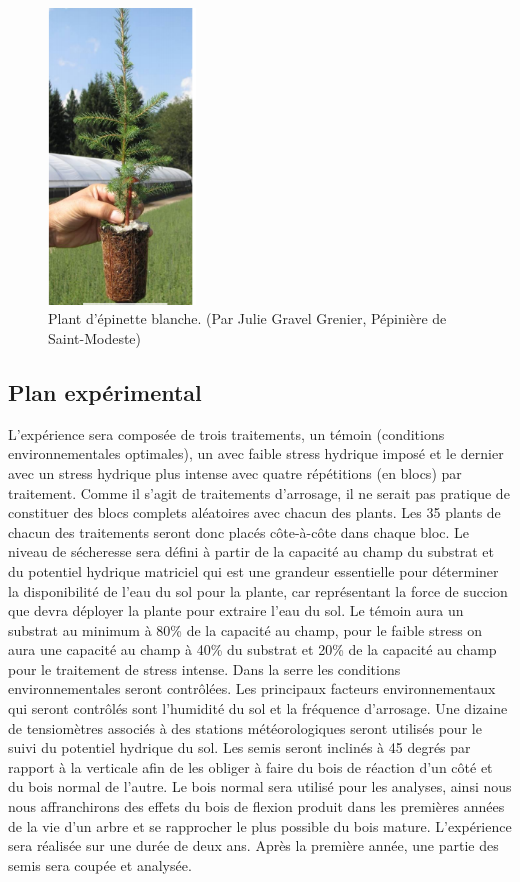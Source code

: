 \documentclass[a4paper,12pt]{report}
\begin{document}
\begin{figure}
	
	\centering
	\includegraphics[width=0.35\textwidth]{plant_epinette.png}
	\caption{Plant d'épinette blanche. (Par Julie Gravel Grenier, Pépinière de Saint-Modeste)}
	\label{plant}	
	
\end{figure}

\subsection*{Plan expérimental}

L'expérience sera composée de trois traitements, un témoin (conditions environnementales optimales), un avec faible stress hydrique imposé et le dernier avec un stress hydrique plus intense avec quatre répétitions (en blocs) par traitement. Comme il s'agit de traitements d'arrosage, il ne serait pas pratique de constituer des blocs complets aléatoires avec chacun des plants. Les 35 plants de chacun des traitements seront donc placés côte-à-côte dans chaque bloc. Le niveau de sécheresse sera défini à partir de la capacité au champ du substrat et du potentiel hydrique matriciel qui est une grandeur essentielle pour déterminer la disponibilité de l’eau du sol pour la plante, car représentant la force de succion que devra déployer la plante pour extraire l’eau du sol. Le témoin aura un substrat au minimum à 80\% de la capacité au champ, pour le faible stress on aura une capacité au champ à 40\% du substrat et 20\% de la capacité au champ pour le traitement de stress intense. Dans la serre les conditions environnementales seront contrôlées. Les principaux facteurs environnementaux qui seront contrôlés sont l'humidité du sol et la fréquence d'arrosage. Une dizaine de tensiomètres associés à des stations météorologiques seront utilisés pour le suivi du potentiel hydrique du sol. Les semis seront inclinés à 45 degrés par rapport à la verticale afin de les obliger à faire du bois de réaction d'un côté et du bois normal de l'autre. Le bois normal sera utilisé pour les analyses, ainsi nous nous affranchirons des effets du bois de flexion produit dans les premières années de la vie d'un arbre \citep{Telewski1989} et se rapprocher le plus possible du bois mature. L'expérience sera réalisée sur une durée de deux ans. Après la première année, une partie des semis sera coupée et analysée.
\end{document}
